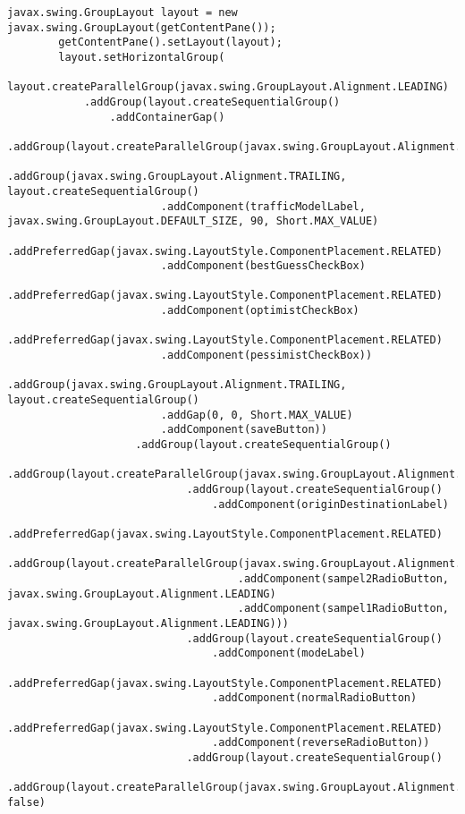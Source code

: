 \begin{lstlisting}[caption= main.java]
        javax.swing.GroupLayout layout = new javax.swing.GroupLayout(getContentPane());
        getContentPane().setLayout(layout);
        layout.setHorizontalGroup(
            layout.createParallelGroup(javax.swing.GroupLayout.Alignment.LEADING)
            .addGroup(layout.createSequentialGroup()
                .addContainerGap()
                .addGroup(layout.createParallelGroup(javax.swing.GroupLayout.Alignment.LEADING)
                    .addGroup(javax.swing.GroupLayout.Alignment.TRAILING, layout.createSequentialGroup()
                        .addComponent(trafficModelLabel, javax.swing.GroupLayout.DEFAULT_SIZE, 90, Short.MAX_VALUE)
                        .addPreferredGap(javax.swing.LayoutStyle.ComponentPlacement.RELATED)
                        .addComponent(bestGuessCheckBox)
                        .addPreferredGap(javax.swing.LayoutStyle.ComponentPlacement.RELATED)
                        .addComponent(optimistCheckBox)
                        .addPreferredGap(javax.swing.LayoutStyle.ComponentPlacement.RELATED)
                        .addComponent(pessimistCheckBox))
                    .addGroup(javax.swing.GroupLayout.Alignment.TRAILING, layout.createSequentialGroup()
                        .addGap(0, 0, Short.MAX_VALUE)
                        .addComponent(saveButton))
                    .addGroup(layout.createSequentialGroup()
                        .addGroup(layout.createParallelGroup(javax.swing.GroupLayout.Alignment.LEADING)
                            .addGroup(layout.createSequentialGroup()
                                .addComponent(originDestinationLabel)
                                .addPreferredGap(javax.swing.LayoutStyle.ComponentPlacement.RELATED)
                                .addGroup(layout.createParallelGroup(javax.swing.GroupLayout.Alignment.TRAILING)
                                    .addComponent(sampel2RadioButton, javax.swing.GroupLayout.Alignment.LEADING)
                                    .addComponent(sampel1RadioButton, javax.swing.GroupLayout.Alignment.LEADING)))
                            .addGroup(layout.createSequentialGroup()
                                .addComponent(modeLabel)
                                .addPreferredGap(javax.swing.LayoutStyle.ComponentPlacement.RELATED)
                                .addComponent(normalRadioButton)
                                .addPreferredGap(javax.swing.LayoutStyle.ComponentPlacement.RELATED)
                                .addComponent(reverseRadioButton))
                            .addGroup(layout.createSequentialGroup()
                                .addGroup(layout.createParallelGroup(javax.swing.GroupLayout.Alignment.TRAILING, false)

\end{lstlisting}
